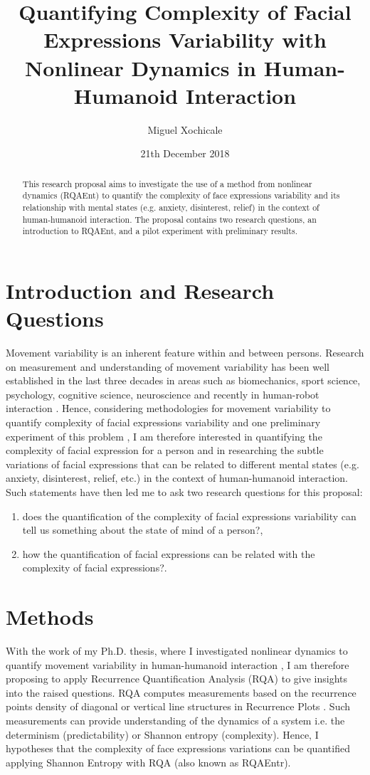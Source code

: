 \documentclass[12pt]{article}
\title{Quantifying Complexity of Facial Expressions 
Variability with Nonlinear Dynamics
in Human-Humanoid Interaction}
\author{Miguel Xochicale\\ 
}
\date{21th December 2018}
\begin{document}
\maketitle


\begin{abstract}
This research proposal aims to investigate the use of a method from nonlinear dynamics 
(RQAEnt) to quantify the complexity of face expressions variability and 
its relationship with mental states (e.g. anxiety, disinterest, relief)
in the context of human-humanoid interaction. 
The proposal contains two research questions,
an introduction to RQAEnt, and a pilot experiment with preliminary results.
\end{abstract}


\section{Introduction and Research Questions}
Movement variability is an inherent feature within and between persons. 
Research on measurement and understanding of movement variability has been 
well established in the last three decades in areas such as biomechanics, 
sport science, psychology, cognitive science, neuroscience and recently
in human-robot interaction \cite{2018arXiv181009249X}.
Hence, considering methodologies for movement variability 
to quantify complexity of facial expressions variability 
and one preliminary experiment of this problem \cite{MPXochicale_CERE2018},
I am therefore interested in quantifying the complexity 
of facial expression for a person and in researching 
the subtle variations of facial expressions that can be related to different 
mental states (e.g. anxiety, disinterest, relief, etc.) \cite{back2014}
in the context of human-humanoid interaction.
Such statements have then led me to ask two research questions for this
proposal: 
\begin{enumerate}[label=(\roman*)]
 \item does the quantification of the complexity of facial expressions 
	variability can tell us something about the state of mind of a person?, 
\item how the quantification of facial expressions can be related with 
the complexity of facial expressions?.
\end{enumerate}

\section{Methods}
With the work of my Ph.D. thesis, where I investigated nonlinear dynamics
to quantify movement variability in 
human-humanoid interaction \cite{XochicalePhDThesis2018},
I am therefore proposing to apply Recurrence Quantification Analysis (RQA) to
give insights into the raised questions.
RQA computes measurements based on the recurrence points density of diagonal 
or vertical line structures in Recurrence Plots \cite{marwan2007}. 
Such measurements can provide understanding of the dynamics of a system 
i.e. the determinism (predictability) or Shannon entropy (complexity).
Hence, I hypotheses that the complexity of face expressions variations 
can be quantified applying Shannon Entropy with RQA (also known as RQAEntr).
\end{document}
